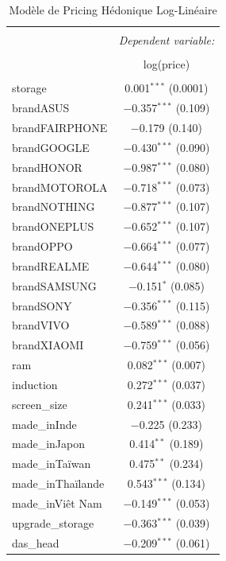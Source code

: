 \documentclass[
  12pt,
]{report}
\begin{document}
\begin{table}[!htbp] \centering 
  \caption{Modèle de Pricing Hédonique Log-Linéaire } 
  \label{} 
\footnotesize 
\begin{tabular}{@{\extracolsep{5pt}}lc} 
\\[-1.8ex]\hline 
\hline \\[-1.8ex] 
 & \multicolumn{1}{c}{\textit{Dependent variable:}} \\ 
\cline{2-2} 
\\[-1.8ex] & log(price) \\ 
\hline \\[-1.8ex] 
 storage & 0.001$^{***}$ (0.0001) \\ 
  brandASUS & $-$0.357$^{***}$ (0.109) \\ 
  brandFAIRPHONE & $-$0.179 (0.140) \\ 
  brandGOOGLE & $-$0.430$^{***}$ (0.090) \\ 
  brandHONOR & $-$0.987$^{***}$ (0.080) \\ 
  brandMOTOROLA & $-$0.718$^{***}$ (0.073) \\ 
  brandNOTHING & $-$0.877$^{***}$ (0.107) \\ 
  brandONEPLUS & $-$0.652$^{***}$ (0.107) \\ 
  brandOPPO & $-$0.664$^{***}$ (0.077) \\ 
  brandREALME & $-$0.644$^{***}$ (0.080) \\ 
  brandSAMSUNG & $-$0.151$^{*}$ (0.085) \\ 
  brandSONY & $-$0.356$^{***}$ (0.115) \\ 
  brandVIVO & $-$0.589$^{***}$ (0.088) \\ 
  brandXIAOMI & $-$0.759$^{***}$ (0.056) \\ 
  ram & 0.082$^{***}$ (0.007) \\ 
  induction & 0.272$^{***}$ (0.037) \\ 
  screen\_size & 0.241$^{***}$ (0.033) \\ 
  made\_inInde & $-$0.225 (0.233) \\ 
  made\_inJapon & 0.414$^{**}$ (0.189) \\ 
  made\_inTaïwan & 0.475$^{**}$ (0.234) \\ 
  made\_inThaïlande & 0.543$^{***}$ (0.134) \\ 
  made\_inViêt Nam & $-$0.149$^{***}$ (0.053) \\ 
  upgrade\_storage & $-$0.363$^{***}$ (0.039) \\ 
  das\_head & $-$0.209$^{***}$ (0.061) \\ 

\end{tabular}
\end{table}
\end{document}
